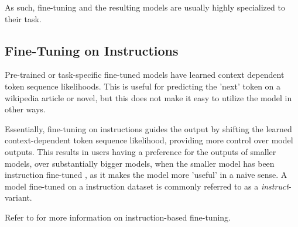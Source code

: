As such, fine-tuning and the resulting models are usually highly specialized to their task.

\subsection{Fine-Tuning on Instructions}\label{sub:instruct}
Pre-trained or task-specific fine-tuned  models have learned context dependent token sequence likelihoods.
This is useful for predicting the 'next' token on a wikipedia article or novel, but this does not make it easy to utilize the model in other ways.

Essentially, fine-tuning on instructions guides the output by shifting the learned context-dependent token sequence likelihood, providing more control over model outputs.
This results in users having a preference for the outputs of smaller models, over substantially bigger models, when the smaller model has been instruction fine-tuned \cite{ouyang_training_2022}, as it makes the model more 'useful' in a naive sense.
A model fine-tuned on  a instruction dataset is commonly referred to as a \textit{instruct}-variant.

Refer to \cite{ouyang_training_2022, tirumala_d4_2023} for more information on instruction-based fine-tuning.


